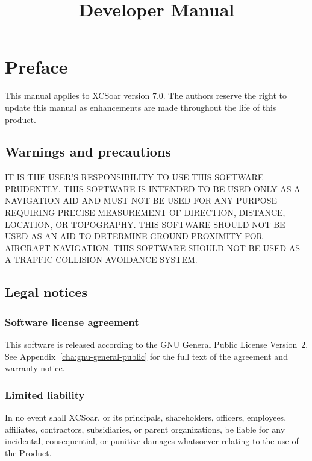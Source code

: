 \documentclass[a4paper,12pt]{refrep}
\title{Developer Manual}
\begin{document}
\maketitle




\chapter*{Preface}

This manual applies to XCSoar version 7.0.  The authors reserve the
right to update this manual as enhancements are made throughout the
life of this product.

\section*{Warnings and precautions}

\warning IT IS THE USER'S RESPONSIBILITY TO USE THIS SOFTWARE PRUDENTLY. THIS
SOFTWARE IS INTENDED TO BE USED ONLY AS A NAVIGATION AID AND MUST NOT
BE USED FOR ANY PURPOSE REQUIRING PRECISE MEASUREMENT OF DIRECTION,
DISTANCE, LOCATION, OR TOPOGRAPHY. THIS SOFTWARE SHOULD NOT BE USED AS
AN AID TO DETERMINE GROUND PROXIMITY FOR AIRCRAFT NAVIGATION.
THIS SOFTWARE SHOULD NOT BE USED AS A TRAFFIC COLLISION AVOIDANCE SYSTEM.


\section*{Legal notices}

\subsection*{Software license agreement}

This software is released according to the GNU General Public License
Version~2.  See Appendix~\ref{cha:gnu-general-public} for the full
text of the agreement and warranty notice.

\subsection*{Limited liability}

In no event shall XCSoar, or its principals, shareholders, officers,
employees, affiliates, contractors, subsidiaries, or parent
organizations, be liable for any incidental, consequential, or
punitive damages whatsoever relating to the use of the Product.
\end{document}
